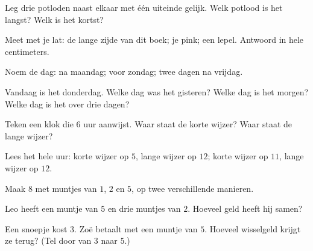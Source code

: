 \begin{exercise}[$\star$]\label{exo:g1:measure:1}
Leg drie potloden naast elkaar met één uiteinde gelijk. Welk potlood is
het langst? Welk is het kortst?
\end{exercise}

\begin{exercise}[$\star$]\label{exo:g1:measure:2}
Meet met je lat: de lange zijde van dit boek; je pink; een lepel.
Antwoord in hele centimeters.
\end{exercise}

\begin{exercise}[$\star$]\label{exo:g1:measure:3}
Noem de dag: na maandag; voor zondag; twee dagen na vrijdag.
\end{exercise}

\begin{exercise}[$\star$]\label{exo:g1:measure:4}
Vandaag is het donderdag. Welke dag was het gisteren? Welke dag is het
morgen? Welke dag is het over drie dagen?
\end{exercise}

\begin{exercise}[$\star$]\label{exo:g1:measure:5}
Teken een klok die $6$ uur aanwijst. Waar staat de korte wijzer? Waar
staat de lange wijzer?
\end{exercise}

\begin{exercise}[$\star$]\label{exo:g1:measure:6}
Lees het hele uur: korte wijzer op $5$, lange wijzer op $12$; korte
wijzer op $11$, lange wijzer op $12$.
\end{exercise}

\begin{exercise}[$\star$]\label{exo:g1:measure:7}
Maak $8$ met muntjes van $1$, $2$ en $5$, op twee verschillende
manieren.
\end{exercise}

\begin{exercise}[$\star$]\label{exo:g1:measure:8}
Leo heeft een muntje van $5$ en drie muntjes van $2$. Hoeveel geld
heeft hij samen?
\end{exercise}

\begin{exercise}[$\star\star$]\label{exo:g1:measure:9}
Een snoepje kost $3$. Zoë betaalt met een muntje van $5$. Hoeveel
wisselgeld krijgt ze terug? (Tel door van $3$ naar $5$.)
\end{exercise}
